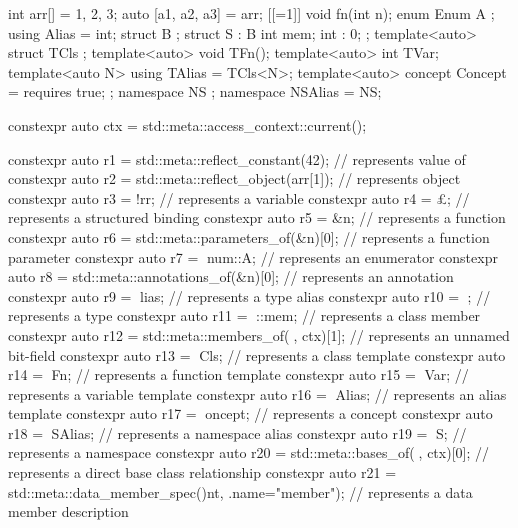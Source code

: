 \begin{example}
\begin{codeblock}
int arr[] = {1, 2, 3};
auto [a1, a2, a3] = arr;
[[=1]] void fn(int n);
enum Enum { A };
using Alias = int;
struct B {};
struct S : B {
  int mem;
  int : 0;
};
template<auto> struct TCls {};
template<auto> void TFn();
template<auto> int TVar;
template<auto N> using TAlias = TCls<N>;
template<auto> concept Concept = requires { true; };
namespace NS {};
namespace NSAlias = NS;

constexpr auto ctx = std::meta::access_context::current();

constexpr auto r1 = std::meta::reflect_constant(42);        // represents  value of 
constexpr auto r2 = std::meta::reflect_object(arr[1]);      // represents  object
constexpr auto r3 = ^^arr;                                  // represents a variable
constexpr auto r4 = ^^a3;                                   // represents a structured binding
constexpr auto r5 = ^^fn;                                   // represents a function
constexpr auto r6 = std::meta::parameters_of(^^fn)[0];      // represents a function parameter
constexpr auto r7 = ^^Enum::A;                              // represents an enumerator
constexpr auto r8 = std::meta::annotations_of(^^fn)[0];     // represents an annotation
constexpr auto r9 = ^^Alias;                                // represents a type alias
constexpr auto r10 = ^^S;                                   // represents a type
constexpr auto r11 = ^^S::mem;                              // represents a class member
constexpr auto r12 = std::meta::members_of(^^S, ctx)[1];    // represents an unnamed bit-field
constexpr auto r13 = ^^TCls;                                // represents a class template
constexpr auto r14 = ^^TFn;                                 // represents a function template
constexpr auto r15 = ^^TVar;                                // represents a variable template
constexpr auto r16 = ^^TAlias;                              // represents an alias template
constexpr auto r17 = ^^Concept;                             // represents a concept
constexpr auto r18 = ^^NSAlias;                             // represents a namespace alias
constexpr auto r19 = ^^NS;                                  // represents a namespace
constexpr auto r20 = std::meta::bases_of(^^S, ctx)[0];      // represents a direct base class relationship
constexpr auto r21 =
  std::meta::data_member_spec(^^int, {.name="member"});     // represents a data member description
\end{codeblock}
\end{example}

